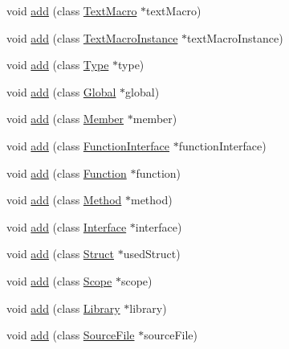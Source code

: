 \begin{CompactItemize}
\item 
void \hyperlink{classvjassdoc_1_1Parser_6d7f84436463d1caa3f202e88d2b0328}{add} (class \hyperlink{classvjassdoc_1_1TextMacro}{TextMacro} $\ast$textMacro)
\item 
void \hyperlink{classvjassdoc_1_1Parser_e78afa8f5282b6bcd9a8de4bbe75fb64}{add} (class \hyperlink{classvjassdoc_1_1TextMacroInstance}{TextMacroInstance} $\ast$textMacroInstance)
\item 
void \hyperlink{classvjassdoc_1_1Parser_2fd653b79c50d22f2c70c5369ee2ced8}{add} (class \hyperlink{classvjassdoc_1_1Type}{Type} $\ast$type)
\item 
void \hyperlink{classvjassdoc_1_1Parser_bd2d13ef307eadef593f83e8c952067d}{add} (class \hyperlink{classvjassdoc_1_1Global}{Global} $\ast$global)
\item 
void \hyperlink{classvjassdoc_1_1Parser_ddda23536e0ecdd5cca50f5416c261ec}{add} (class \hyperlink{classvjassdoc_1_1Member}{Member} $\ast$member)
\item 
void \hyperlink{classvjassdoc_1_1Parser_ed94ad9b4d34159e1748e3161e677910}{add} (class \hyperlink{classvjassdoc_1_1FunctionInterface}{FunctionInterface} $\ast$functionInterface)
\item 
void \hyperlink{classvjassdoc_1_1Parser_226e950395445f3384039c9a36efff6e}{add} (class \hyperlink{classvjassdoc_1_1Function}{Function} $\ast$function)
\item 
void \hyperlink{classvjassdoc_1_1Parser_a025bb6454379b6c56b26bdaf9e736d8}{add} (class \hyperlink{classvjassdoc_1_1Method}{Method} $\ast$method)
\item 
void \hyperlink{classvjassdoc_1_1Parser_8cef84842aa31265b09995ee9eb46414}{add} (class \hyperlink{classvjassdoc_1_1Interface}{Interface} $\ast$interface)
\item 
void \hyperlink{classvjassdoc_1_1Parser_12dc09577a80de9cbb73be82717801d8}{add} (class \hyperlink{classvjassdoc_1_1Struct}{Struct} $\ast$usedStruct)
\item 
void \hyperlink{classvjassdoc_1_1Parser_6694c7230e7593afc9a2b0a4e7d62223}{add} (class \hyperlink{classvjassdoc_1_1Scope}{Scope} $\ast$scope)
\item 
void \hyperlink{classvjassdoc_1_1Parser_687ea929ab18eac54ca8ec7ee11fa6bd}{add} (class \hyperlink{classvjassdoc_1_1Library}{Library} $\ast$library)
\item 
void \hyperlink{classvjassdoc_1_1Parser_51c198043bbaf99de2dff41743ad52f5}{add} (class \hyperlink{classvjassdoc_1_1SourceFile}{SourceFile} $\ast$sourceFile)
\item 

\end{CompactItemize}
